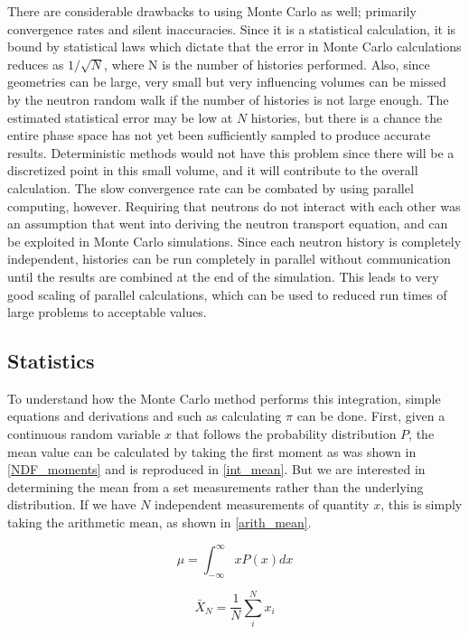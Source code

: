 There are considerable drawbacks to using Monte Carlo as well; primarily convergence rates and silent inaccuracies.  Since it is a statistical calculation, it is bound by statistical laws which dictate that the error in Monte Carlo calculations reduces as $1/\sqrt{N}$, where N is the number of histories performed.  Also, since geometries can be large, very small but very influencing volumes can be missed by the neutron random walk if the number of histories is not large enough.  The estimated statistical error may be low at $N$ histories, but there is a chance the entire phase space has not yet been sufficiently sampled to produce accurate results.  Deterministic methods would not have this problem since there will be a discretized point in this small volume, and it will contribute to the overall calculation.  The slow convergence rate can be combated by using parallel computing, however.  Requiring that neutrons do not interact with each other was an assumption that went into deriving the neutron transport equation, and can be exploited in Monte Carlo simulations.  Since each neutron history is completely independent, histories can be run completely in parallel without communication until the results are combined at the end of the simulation.  This leads to very good scaling of parallel calculations, which can be used to reduced run times of large problems to acceptable values.

\subsection{Statistics}
\label{sec:stat}

To understand how the Monte Carlo method performs this integration, simple equations and derivations and such as calculating $\pi$ can be done.   First, given a continuous random variable $x$ that follows the probability distribution $P$, the mean value can be calculated by taking the first moment as was shown in \eqref{NDF_moments} and is reproduced in \eqref{int_mean}.  But we are interested in determining the mean from a set measurements rather than the underlying distribution.  If we have $N$ independent measurements of quantity $x$, this is simply taking the arithmetic mean, as shown in \eqref{arith_mean}.

\begin{equation}
\label{int_mean}
\mu = \int_{-\infty}^{\infty} x P(x) dx
\end{equation}

\begin{equation}
\label{arith_mean}
\bar{X}_N = \frac{1}{N} \sum_i^N x_i
\end{equation}

